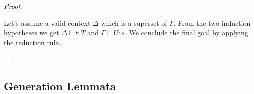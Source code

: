 \begin{theorem}
\begin{proof}
\begin{enumerate}
            Let's assume a valid context $\Delta$ which is a superset of
            $\Gamma$. From the two induction hypotheses we get $\Delta \vdash t
            : T$ and $\Gamma \vdash U : s$. We conclude the final goal by
            applying the reduction rule.
        \end{enumerate}
    \end{proof}
\end{theorem}






\subsection{Generation Lemmata}

